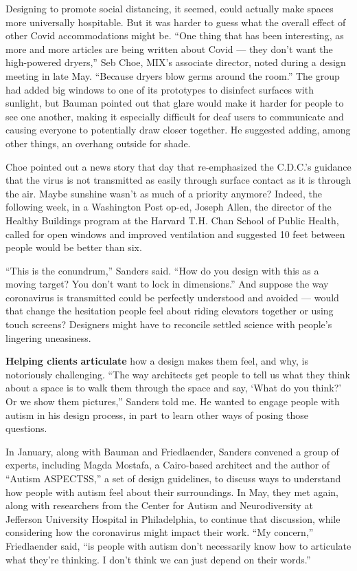 Designing to promote social distancing, it seemed, could actually make
spaces more universally hospitable. But it was harder to guess what the
overall effect of other Covid accommodations might be. ``One thing that
has been interesting, as more and more articles are being written about
Covid --- they don't want the high-powered dryers,'' Seb Choe, MIX's
associate director, noted during a design meeting in late May. ``Because
dryers blow germs around the room.'' The group had added big windows to
one of its prototypes to disinfect surfaces with sunlight, but Bauman
pointed out that glare would make it harder for people to see one
another, making it especially difficult for deaf users to communicate
and causing everyone to potentially draw closer together. He suggested
adding, among other things, an overhang outside for shade.

Choe pointed out a news story that day that re-emphasized the C.D.C.'s
guidance that the virus is not transmitted as easily through surface
contact as it is through the air. Maybe sunshine wasn't as much of a
priority anymore? Indeed, the following week, in a Washington Post
op-ed, Joseph Allen, the director of the Healthy Buildings program at
the Harvard T.H. Chan School of Public Health, called for open windows
and improved ventilation and suggested 10 feet between people would be
better than six.

``This is the conundrum,'' Sanders said. ``How do you design with this
as a moving target? You don't want to lock in dimensions.'' And suppose
the way coronavirus is transmitted could be perfectly understood and
avoided --- would that change the hesitation people feel about riding
elevators together or using touch screens? Designers might have to
reconcile settled science with people's lingering uneasiness.

\textbf{Helping clients} \textbf{articulate} how a design makes them
feel, and why, is notoriously challenging. ``The way architects get
people to tell us what they think about a space is to walk them through
the space and say, `What do you think?' Or we show them pictures,''
Sanders told me. He wanted to engage people with autism in his design
process, in part to learn other ways of posing those questions.

In January, along with Bauman and Friedlaender, Sanders convened a group
of experts, including Magda Mostafa, a Cairo-based architect and the
author of ``Autism ASPECTSS,'' a set of design guidelines, to discuss
ways to understand how people with autism feel about their surroundings.
In May, they met again, along with researchers from the Center for
Autism and Neurodiversity at Jefferson University Hospital in
Philadelphia, to continue that discussion, while considering how the
coronavirus might impact their work. ``My concern,'' Friedlaender said,
``is people with autism don't necessarily know how to articulate what
they're thinking. I don't think we can just depend on their words.''

